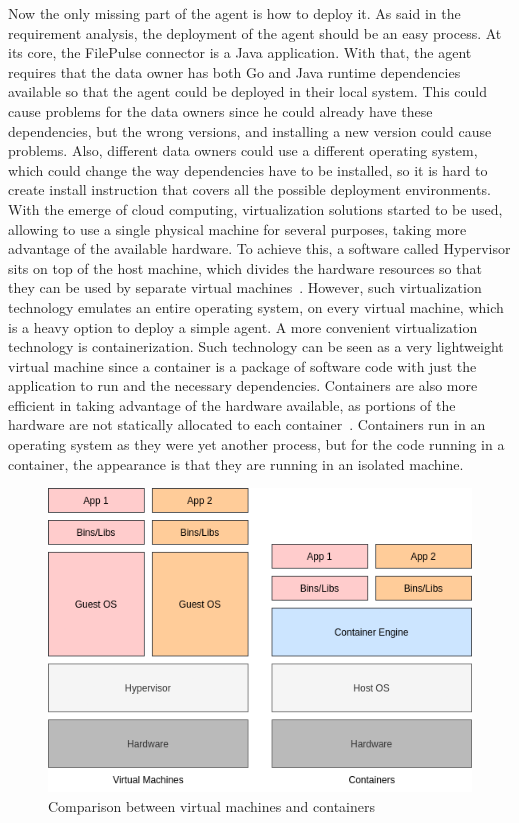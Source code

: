 Now the only missing part of the agent is how to deploy it.
As said in the requirement analysis, the deployment of the agent should be an easy process.
At its core, the FilePulse connector is a Java application.
With that, the agent requires that the data owner has both Go and Java runtime dependencies available so that the agent could be deployed in their local system.
This could cause problems for the data owners since he could already have these dependencies, but the wrong versions, and installing a new version could cause problems.
Also, different data owners could use a different operating system, which could change the way dependencies have to be installed, so it is hard to create install instruction that covers all the possible deployment environments.
With the emerge of cloud computing, virtualization solutions started to be used, allowing to use a single physical machine for several purposes, taking more advantage of the available hardware.
To achieve this, a software called Hypervisor sits on top of the host machine, which divides the hardware resources so that they can be used by separate virtual machines~\cite{virtualization}.
However, such virtualization technology emulates an entire operating system, on every virtual machine, which is a heavy option to deploy a simple agent.
A more convenient virtualization technology is containerization.
Such technology can be seen as a very lightweight virtual machine since a container is a package of software code with just the application to run and the necessary dependencies.
Containers are also more efficient in taking advantage of the hardware available, as portions of the hardware are not statically allocated to each container~\cite{containers}.
Containers run in an operating system as they were yet another process, but for the code running in a container, the appearance is that they are running in an isolated machine.

\begin{figure}[H]
    \center
    \includegraphics[width=.6\textwidth]{virtualization}
    \caption{Comparison between virtual machines and containers}
    \label{fig:virtualization}
\end{figure}

